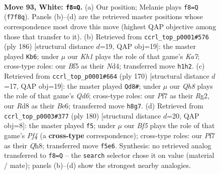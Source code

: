 \documentclass[11pt]{article}
\begin{document}
\clearpage

\begin{figure}[p]\centering
\begin{subfigure}{0.46\textwidth}\centering
\resizebox{\linewidth}{!}{%
\newchessgame
\chessboard[
  setfen={3R3Q/5P2/8/5B2/5k2/8/8/7K w - - 3 93},
  showmover=false,
  pgfstyle=straightmove, color=movearrow, markmove={f7-f8}
]}
\caption{}
\end{subfigure}\hfill
\begin{subfigure}{0.46\textwidth}\centering
\resizebox{\linewidth}{!}{%
\newchessgame
\chessboard[
  setfen={1Q6/K7/8/3k4/3N4/8/8/8 w - - 1 94},
  showmover=false,
  pgfstyle=straightmove, color=movearrow, markmove={a7-b6}
]}
\caption{}
\end{subfigure}
\\[4pt]
\begin{subfigure}{0.46\textwidth}\centering
\resizebox{\linewidth}{!}{%
\newchessgame
\chessboard[
  setfen={5k2/4N3/3QB3/8/8/2K5/6R1/8 w - - 3 86},
  showmover=false,
  pgfstyle=straightmove, color=movearrow, markmove={d6-d8}
]}
\caption{}
\end{subfigure}\hfill
\begin{subfigure}{0.46\textwidth}\centering
\resizebox{\linewidth}{!}{%
\newchessgame
\chessboard[
  setfen={R5QQ/8/8/8/5P2/4k3/6K1/8 w - - 1 91},
  showmover=false,
  pgfstyle=straightmove, color=movearrow, markmove={f4-f5}
]}
\caption{}
\end{subfigure}
\caption{\textbf{Move 93, White: \texttt{f8=Q}.} (a) Our position; Melanie plays \texttt{f8=Q} (\texttt{f7f8q}). Panels (b)--(d) are the retrieved master positions whose correspondence most drove this move (highest QAP objective among those that transfer to it). (b) Retrieved from \texttt{ccrl\_top\_p0001\#576} (ply 186) [structural distance $d$=19, QAP obj=19]: the master played \texttt{Kb6}; under $\mu$ our \emph{Kh1} plays the role of that game's \emph{Ka7}; cross-type roles: our \emph{B}f5 as their \emph{N}d4; transferred move \texttt{h1h2}. (c) Retrieved from \texttt{ccrl\_top\_p0001\#664} (ply 170) [structural distance $d$=17, QAP obj=19]: the master played \texttt{Qd8\#}; under $\mu$ our \emph{Qh8} plays the role of that game's \emph{Qd6}; cross-type roles: our \emph{P}f7 as their \emph{R}g2, our \emph{R}d8 as their \emph{B}e6; transferred move \texttt{h8g7}. (d) Retrieved from \texttt{ccrl\_top\_p0003\#377} (ply 180) [structural distance $d$=20, QAP obj=8]: the master played \texttt{f5}; under $\mu$ our \emph{Bf5} plays the role of that game's \emph{Pf4} (a \textbf{cross-type} correspondence); cross-type roles: our \emph{P}f7 as their \emph{Q}h8; transferred move \texttt{f5e6}. Synthesis: no retrieved analog transferred to \texttt{f8=Q} -- the \texttt{search} selector chose it on value (material / mate); panels (b)--(d) show the strongest nearby analogies.}
\label{fig:thought-m184}
\end{figure}
\end{document}
